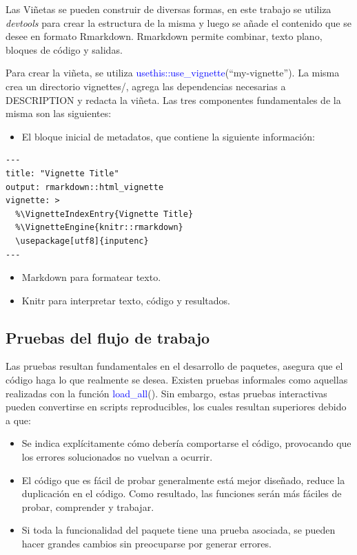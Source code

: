 Las Viñetas se pueden construir de diversas formas, en este trabajo se utiliza \emph{devtools} para crear la estructura de la misma y luego se añade el contenido que se desee en formato Rmarkdown. Rmarkdown permite combinar, texto plano, bloques de código y salidas. 

Para crear la viñeta, se utiliza \textcolor{blue}{usethis::use\_vignette}(``my-vignette''). La misma crea un directorio vignettes/, agrega las dependencias necesarias a DESCRIPTION y redacta la viñeta. Las tres componentes fundamentales de la misma son las siguientes:

\begin{itemize}
\item El bloque inicial de metadatos, que contiene la siguiente información:
\end{itemize}

\begin{verbatim}
---
title: "Vignette Title"
output: rmarkdown::html_vignette
vignette: >
  %\VignetteIndexEntry{Vignette Title}
  %\VignetteEngine{knitr::rmarkdown}
  \usepackage[utf8]{inputenc}
---
\end{verbatim}

\begin{itemize}
\item Markdown para formatear texto.
\item Knitr para interpretar texto, código y resultados.
\end{itemize}

\subsection{Pruebas del flujo de trabajo}

Las pruebas resultan fundamentales en el desarrollo de paquetes, asegura que el código haga lo que realmente se desea. Existen pruebas informales como aquellas realizadas con la función \textcolor{blue}{load\_all}(). Sin embargo, estas pruebas interactivas pueden convertirse en scripts reproducibles, los cuales resultan superiores debido a que:

\begin{itemize}
\item Se indica explícitamente cómo debería comportarse el código, provocando que los errores solucionados no vuelvan a ocurrir.

\item El código que es fácil de probar generalmente está mejor diseñado, reduce la duplicación en el código. Como resultado, las funciones serán más fáciles de probar, comprender y trabajar.

\item Si toda la funcionalidad del paquete tiene una prueba asociada, se pueden hacer grandes cambios sin preocuparse por generar errores.
\end{itemize}



